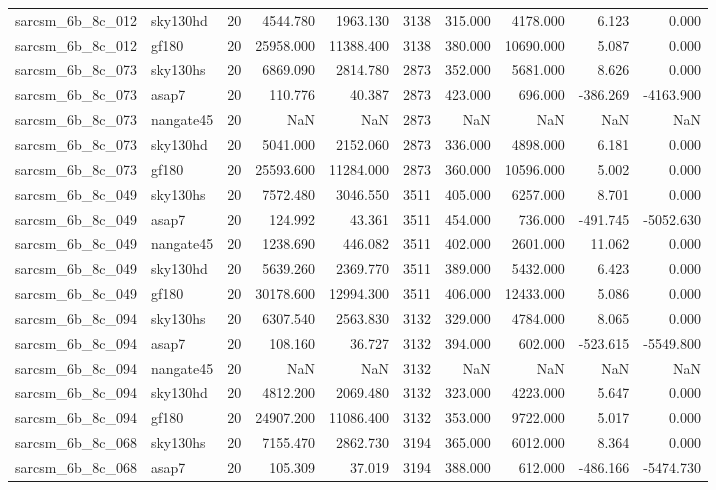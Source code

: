 \begin{longtable}{llrrrrrrrr}
sarcsm\_6b\_8c\_012 & sky130hd & 20 & 4544.780 & 1963.130 & 3138 & 315.000 & 4178.000 & 6.123 & 0.000 \\
sarcsm\_6b\_8c\_012 & gf180 & 20 & 25958.000 & 11388.400 & 3138 & 380.000 & 10690.000 & 5.087 & 0.000 \\
sarcsm\_6b\_8c\_073 & sky130hs & 20 & 6869.090 & 2814.780 & 2873 & 352.000 & 5681.000 & 8.626 & 0.000 \\
sarcsm\_6b\_8c\_073 & asap7 & 20 & 110.776 & 40.387 & 2873 & 423.000 & 696.000 & -386.269 & -4163.900 \\
sarcsm\_6b\_8c\_073 & nangate45 & 20 & NaN & NaN & 2873 & NaN & NaN & NaN & NaN \\
sarcsm\_6b\_8c\_073 & sky130hd & 20 & 5041.000 & 2152.060 & 2873 & 336.000 & 4898.000 & 6.181 & 0.000 \\
sarcsm\_6b\_8c\_073 & gf180 & 20 & 25593.600 & 11284.000 & 2873 & 360.000 & 10596.000 & 5.002 & 0.000 \\
sarcsm\_6b\_8c\_049 & sky130hs & 20 & 7572.480 & 3046.550 & 3511 & 405.000 & 6257.000 & 8.701 & 0.000 \\
sarcsm\_6b\_8c\_049 & asap7 & 20 & 124.992 & 43.361 & 3511 & 454.000 & 736.000 & -491.745 & -5052.630 \\
sarcsm\_6b\_8c\_049 & nangate45 & 20 & 1238.690 & 446.082 & 3511 & 402.000 & 2601.000 & 11.062 & 0.000 \\
sarcsm\_6b\_8c\_049 & sky130hd & 20 & 5639.260 & 2369.770 & 3511 & 389.000 & 5432.000 & 6.423 & 0.000 \\
sarcsm\_6b\_8c\_049 & gf180 & 20 & 30178.600 & 12994.300 & 3511 & 406.000 & 12433.000 & 5.086 & 0.000 \\
sarcsm\_6b\_8c\_094 & sky130hs & 20 & 6307.540 & 2563.830 & 3132 & 329.000 & 4784.000 & 8.065 & 0.000 \\
sarcsm\_6b\_8c\_094 & asap7 & 20 & 108.160 & 36.727 & 3132 & 394.000 & 602.000 & -523.615 & -5549.800 \\
sarcsm\_6b\_8c\_094 & nangate45 & 20 & NaN & NaN & 3132 & NaN & NaN & NaN & NaN \\
sarcsm\_6b\_8c\_094 & sky130hd & 20 & 4812.200 & 2069.480 & 3132 & 323.000 & 4223.000 & 5.647 & 0.000 \\
sarcsm\_6b\_8c\_094 & gf180 & 20 & 24907.200 & 11086.400 & 3132 & 353.000 & 9722.000 & 5.017 & 0.000 \\
sarcsm\_6b\_8c\_068 & sky130hs & 20 & 7155.470 & 2862.730 & 3194 & 365.000 & 6012.000 & 8.364 & 0.000 \\
sarcsm\_6b\_8c\_068 & asap7 & 20 & 105.309 & 37.019 & 3194 & 388.000 & 612.000 & -486.166 & -5474.730 \\

\end{longtable}
